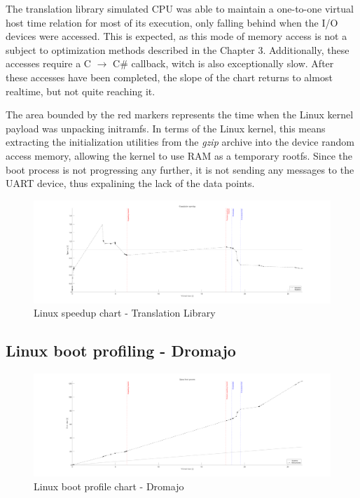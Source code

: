 \noindent
The translation library simulated CPU was able to maintain a one-to-one virtual host time relation for most of
its execution, only falling behind when the I/O devices were accessed. This is expected, as this mode of memory
access is not a subject to optimization methods described in the Chapter 3. Additionally, these accesses require a C
$\rightarrow$ C\# callback, witch is also exceptionally slow. After these accesses have been completed, the slope of the
chart returns to almost realtime, but not quite reaching it.

The area bounded by the red markers represents the time when the Linux kernel payload was unpacking initramfs. In terms
of the Linux kernel, this means extracting the initialization utilities from the \textit{gzip} archive into the
device random access memory, allowing the kernel to use RAM as a temporary rootfs. Since the boot process is not
progressing any further, it is not sending any messages to the UART device, thus expalining the lack of the data
points.

\begin{figure}[h]
	\centering
    \hspace*{-2cm}
	\includegraphics[width=1.2\textwidth]{figures/benchmarks/linux_boot/adnotated/TlibSpeedup.pdf}
	\caption{Linux speedup chart - Translation Library}
\end{figure}

\pagebreak

\subsection*{Linux boot profiling - Dromajo}

\begin{figure}[h]
	\centering
    \hspace*{-2cm}
	\includegraphics[width=1.2\textwidth]{figures/benchmarks/linux_boot/adnotated/DromajoBoot.pdf}
	\caption{Linux boot profile chart - Dromajo}
\end{figure}


